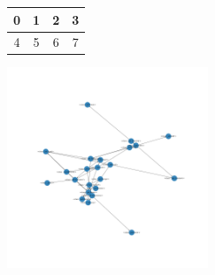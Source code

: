 \documentclass{article}
\begin{document}
\begin{tabular}
{|c|c|c|c|}
	\hline
	0 & 1 & 2 & 3 \\
	\hline
	4 & 5 & 6 & 7 \\
	\hline
\end{tabular}
\includegraphics[width=6cm]{result.png}
\end{document}
